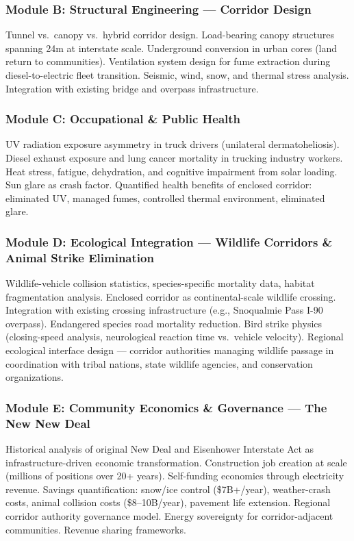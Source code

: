 \documentclass[11pt,letterpaper]{article}
\begin{document}
\subsubsection{Module B: Structural Engineering --- Corridor Design}
Tunnel vs.\ canopy vs.\ hybrid corridor design. Load-bearing canopy structures spanning 24m at interstate scale. Underground conversion in urban cores (land return to communities). Ventilation system design for fume extraction during diesel-to-electric fleet transition. Seismic, wind, snow, and thermal stress analysis. Integration with existing bridge and overpass infrastructure.

\subsubsection{Module C: Occupational \& Public Health}
UV radiation exposure asymmetry in truck drivers (unilateral dermatoheliosis). Diesel exhaust exposure and lung cancer mortality in trucking industry workers. Heat stress, fatigue, dehydration, and cognitive impairment from solar loading. Sun glare as crash factor. Quantified health benefits of enclosed corridor: eliminated UV, managed fumes, controlled thermal environment, eliminated glare.

\subsubsection{Module D: Ecological Integration --- Wildlife Corridors \& Animal Strike Elimination}
Wildlife-vehicle collision statistics, species-specific mortality data, habitat fragmentation analysis. Enclosed corridor as continental-scale wildlife crossing. Integration with existing crossing infrastructure (e.g., Snoqualmie Pass I-90 overpass). Endangered species road mortality reduction. Bird strike physics (closing-speed analysis, neurological reaction time vs.\ vehicle velocity). Regional ecological interface design --- corridor authorities managing wildlife passage in coordination with tribal nations, state wildlife agencies, and conservation organizations.

\subsubsection{Module E: Community Economics \& Governance --- The New New Deal}
Historical analysis of original New Deal and Eisenhower Interstate Act as infrastructure-driven economic transformation. Construction job creation at scale (millions of positions over 20+ years). Self-funding economics through electricity revenue. Savings quantification: snow/ice control (\$7B+/year), weather-crash costs, animal collision costs (\$8--10B/year), pavement life extension. Regional corridor authority governance model. Energy sovereignty for corridor-adjacent communities. Revenue sharing frameworks.
\end{document}
